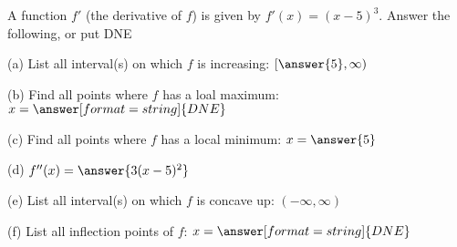 \documentclass{ximera}
\begin{document}
\begin{exercise}
A function $f'$ (the derivative of $f$) is given by $f'(x)=(x-5)^3$. Answer the following, or put DNE

(a) List all interval(s) on which $f$ is increasing: $[\answer{5},\infty)$

(b) Find all points where $f$ has a loal maximum: $x=\answer[format=string]{DNE}$

(c) Find all points where $f$ has a local minimum: $x=\answer{5}$

(d) $f''(x)=\answer{3(x-5)^2}$

(e) List all interval(s) on which $f$ is concave up: $(-\infty,\infty)$

(f) List all inflection points of $f$: $x=\answer[format=string]{DNE}$

\end{exercise}
\end{document}
